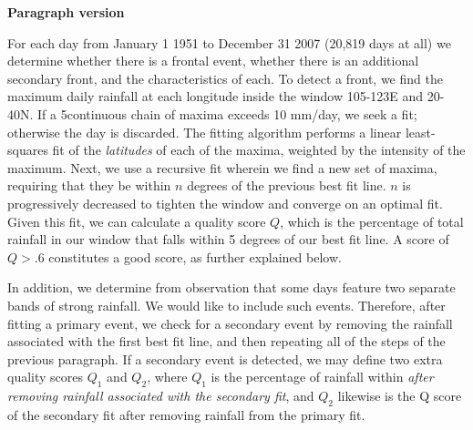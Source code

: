 \documentclass[draft,grl]{AGUTeX}
\begin{document}
\begin{article}

	\textbf{Paragraph version}

	For each day from January 1 1951 to December 31 2007 (20,819 days at all) we determine whether there is a frontal event, whether there is an additional secondary front, and the characteristics of each. To detect a front, we find the maximum daily rainfall at each longitude inside the window 105-123\textdegree E and 20-40\textdegree N. If a 5\textdegree continuous chain of maxima exceeds 10 mm/day, we seek a fit; otherwise the day is discarded. The fitting algorithm performs a linear least-squares fit of the \textit{latitudes} of each of the maxima, weighted by the intensity of the maximum. Next, we use a recursive fit wherein we find a new set of maxima, requiring that they be within $n$ degrees of the previous best fit line. $n$ is progressively decreased to tighten the window and converge on an optimal fit. Given this fit, we can calculate a quality score $Q$, which is the percentage of total rainfall in our window that falls within 5 degrees of our best fit line. A score of $Q > .6$ constitutes a good score, as further explained below.
	
	In addition, we determine from observation that some days feature two separate bands of strong rainfall. We would like to include such events. Therefore, after fitting a primary event, we check for a secondary event by removing the rainfall associated with the first best fit line, and then repeating all of the steps of the previous paragraph. If a secondary event is detected, we may define two extra quality scores $Q_1$ and $Q_2$, where $Q_1$ is the percentage of rainfall within \textit{after removing rainfall associated with the secondary fit}, and $Q_2$ likewise is the Q score of the secondary fit after removing rainfall from the primary fit.
	

\end{article}
\end{document}
